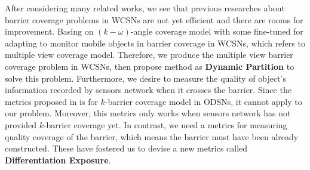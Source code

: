 After considering many related works, we see that previous researches about barrier coverage problems in WCSNs are not yet efficient and there are rooms for improvement. Basing on $(k-\omega)$-angle coverage model \cite{xu2016minimum} with some fine-tuned for adapting to monitor mobile objects in barrier coverage in WCSNs, which refers to multiple view coverage model. Therefore, we produce the multiple view barrier coverage problem in WCSNs, then propose method as \textcolor{ProcessBlue}{\bfseries Dynamic Partition} to solve this problem. Furthermore, we desire to measure the quality of object's information recorded by sensors network when it crosses the barrier. Since the metrics proposed in \cite{chen2008measuring} is for $k$-barrier coverage model in ODSNs, it cannot apply to our problem. Moreover, this metrics only works when sensors network has not provided $k$-barrier coverage yet. In contrast, we need a metrics for measuring quality coverage of the barrier, which means the barrier must have been already constructed. These have fostered us to devise a new metrics called \textcolor{ProcessBlue}{\bfseries Differentiation Exposure}.


